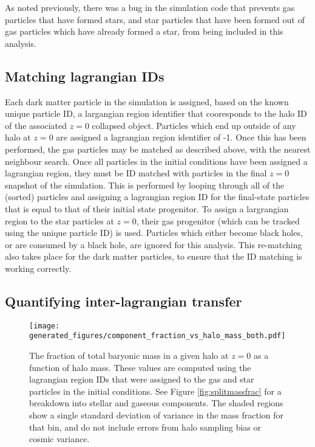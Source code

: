 As noted previously, there was a bug in the simulation code that prevents gas
particles that have formed stars, and star particles that have been formed
out of gas particles which have already formed a star, from being included in
this analysis.

\subsection{Matching lagrangian IDs}

Each dark matter particle in the simulation is assigned, based on the known
unique particle ID, a largangian region identifier that cooresponds to the halo
ID of the associated $z=0$ collapsed object. Particles which end up outside of
any halo at $z=0$ are assigned a lagrangian region identifier of -1. Once this
has been performed, the gas particles may be matched as described above, with
the nearest neighbour search. Once all particles in the initial conditions have
been assigned a lagrangian region, they must be ID matched with particles in
the final $z=0$ snapshot of the simulation. This is performed by looping
through all of the (sorted) particles and assigning a lagrangian region ID for
the final-state particles that is equal to that of their initial state
progenitor. To assign a largrangian region to the star particles at $z=0$,
their gas progenitor (which can be tracked using the unique particle ID) is
used. Particles which either become black holes, or are consumed by a black
hole, are ignored for this analysis. This re-matching also takes place for the
dark matter particles, to ensure that the ID matching is working correctly.

\subsection{Quantifying inter-lagrangian transfer}

\begin{figure} \centering
	\texttt{[image: generated\_figures/component\_fraction\_vs\_halo\_mass\_both.pdf]}
	\caption{The fraction of total baryonic mass in a given halo at $z=0$
	as a function of halo mass. These values are computed using the
	lagrangian region IDs that were assigned to the gas and star particles
	in the initial conditions. See Figure \ref{fig:splitmassfrac} for a
	breakdown into stellar and gaseous components. The shaded regions show
	a single standard deviation of variance in the mass fraction for that
	bin, and do not include errors from halo sampling bias or cosmic
	variance.} \label{fig:massfrac} \end{figure}

